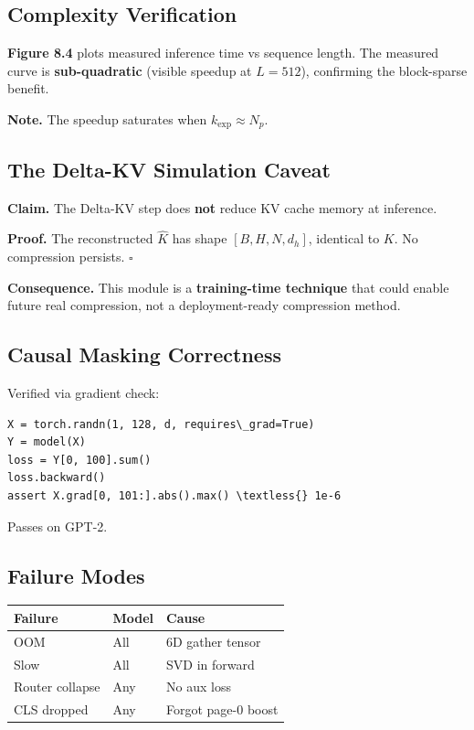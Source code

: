 \subsection{Complexity Verification}

\textbf{Figure 8.4} plots measured inference time vs sequence length. The 
measured curve is \textbf{sub-quadratic} (visible speedup at $L = 512$), 
confirming the block-sparse benefit.

\textbf{Note.} The speedup saturates when $k_\text{exp} \approx N_p$.

\subsection{The Delta-KV Simulation Caveat}

\textbf{Claim.} The Delta-KV step does \textbf{not} reduce KV cache memory at inference.

\textbf{Proof.} The reconstructed $\hat{K}$ has shape $[B, H, N, d_h]$, identical 
to $K$. No compression persists. $\square$

\textbf{Consequence.} This module is a \textbf{training-time technique} that could 
enable future real compression, not a deployment-ready compression method.

\subsection{Causal Masking Correctness}

Verified via gradient check:

\begin{lstlisting}
X = torch.randn(1, 128, d, requires\_grad=True)
Y = model(X)
loss = Y[0, 100].sum()
loss.backward()
assert X.grad[0, 101:].abs().max() \textless{} 1e-6
\end{lstlisting}

Passes on GPT-2.

\subsection{Failure Modes}

\begin{table}[H]
\centering
\small
\begin{tabular}{lll}
\toprule
\textbf{Failure} & \textbf{Model} & \textbf{Cause} \\
\midrule
OOM & All & 6D gather tensor \\
Slow & All & SVD in forward \\
Router collapse & Any & No aux loss \\
CLS dropped & Any & Forgot page-0 boost \\
\bottomrule
\end{tabular}
\end{table}

